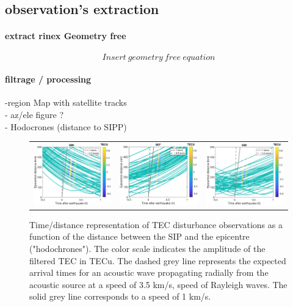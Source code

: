 \documentclass{gji}
\begin{document}
	\subsection{observation's extraction} 
       
       \paragraph{extract rinex Geometry free}
       
  \begin{equation}
Insert ~ geometry ~ free ~ equation
 \end{equation}
        \paragraph{filtrage / processing} 
        
        
            -region Map with satellite tracks\\
            - az/ele figure ?\\
            - Hodocrones (distance to SIPP)\\

\begin{figure}
 \begin{tabular}{l c r}
\includegraphics[width=0.3\linewidth]{images/hodocrone_G06.eps} & 
\includegraphics[width=0.3\linewidth]{images/hodocrone_G07.eps} &
\includegraphics[width=0.3\linewidth]{images/hodocrone_G30.eps}
 
\end{tabular}
\caption{ Time/distance representation of TEC disturbance observations as a function of the distance between the SIP and the epicentre ("hodochrones"). The color scale indicates the amplitude of the filtered TEC  in TECu. The dashed grey line represents the expected arrival times for an acoustic wave propagating radially from the acoustic source at a speed of 3.5 km/s, speed of Rayleigh waves. The solid grey line corresponds to a speed of 1 km/s. }
\label{Hodochrone}
\end{figure}
\end{document}
